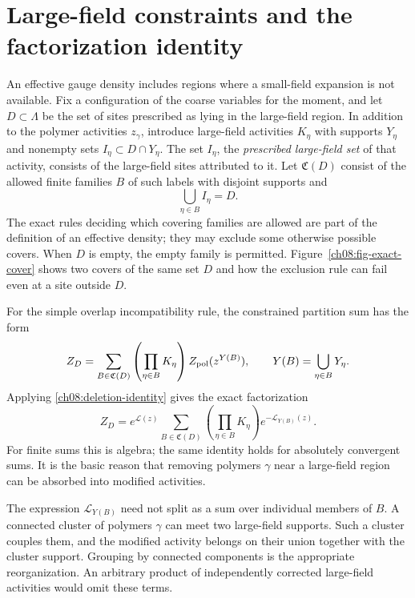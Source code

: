 \section{Large-field constraints and the factorization identity}
\label{ch08:forced}

An effective gauge density includes regions where a small-field expansion
is not available. Fix a configuration of the coarse variables for the
moment, and let $D\subset\Lambda$ be the set of sites prescribed as lying in
the large-field region. In addition to the polymer activities
$z_\gamma$, introduce large-field activities $K_\eta$ with supports
$Y_\eta$ and nonempty sets $I_\eta\subset D\cap Y_\eta$.
The set $I_\eta$, the \emph{prescribed large-field set} of that activity, consists of the large-field sites attributed to it.
Let $\mathfrak C(D)$ consist of the allowed finite families $B$ of such
labels with disjoint supports and
\[
 \bigcup_{\eta\in B} I_\eta=D.
\]
The exact rules deciding which covering families are allowed are part of the definition of an effective
density; they may exclude some otherwise possible covers. When $D$ is
empty, the empty family is permitted. Figure~\ref{ch08:fig-exact-cover}
shows two covers of the same set \(D\) and how the exclusion rule can fail
even at a site outside \(D\).



For the simple overlap incompatibility rule, the constrained partition
sum has the form
\begin{equation}\label{ch08:constrained}
 Z_D=\sum_{B\in\mathfrak C(D)}
       \left(\prod_{\eta\in B}K_\eta\right)
       Z_{\rm pol}(z^{Y(B)}),\qquad
 Y(B)=\bigcup_{\eta\in B}Y_\eta.
\end{equation}
Applying \eqref{ch08:deletion-identity} gives the exact factorization
\begin{equation}\label{ch08:reassembly}
 Z_D=e^{\mathcal L(z)}
       \sum_{B\in\mathfrak C(D)}
         \left(\prod_{\eta\in B}K_\eta\right)
         e^{-\mathcal L_{Y(B)}(z)}.
\end{equation}
For finite sums this is algebra; the same identity holds for absolutely
convergent sums. It is the basic reason that removing polymers $\gamma$
near a large-field region can be absorbed into modified activities.

The expression $\mathcal L_{Y(B)}$ need not split as a sum over individual
members of $B$. A connected cluster of polymers $\gamma$ can meet two large-field
supports. Such a cluster couples them, and the modified activity belongs
on their union together with the cluster support. Grouping by connected
components is the appropriate reorganization. An arbitrary product of
independently corrected large-field activities would omit these terms.

